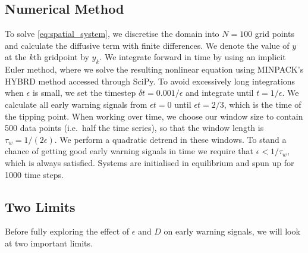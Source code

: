 \subsection{Numerical Method}
To solve \cref{eq:spatial_system}, we discretise the domain into $N = 100$ grid
points and 
calculate the diffusive term with finite differences. We denote the value of $y$ at the $k$th gridpoint by $y_k$. We integrate forward in time by 
using an implicit Euler method, where we solve the resulting nonlinear equation using 
MINPACK's HYBRD method accessed through SciPy\cite{Virtanen2020}. To avoid excessively long integrations when $\epsilon$ is small,
we set the timestep $\delta t = 0.001/\epsilon$ and integrate until $t=1/\epsilon$. We
calculate all early warning signals from $\epsilon t=0$ until $\epsilon t=2/3$, which is the 
time of the tipping point. When working over time, we choose our window size to 
contain 500 data points (i.e.\ half the time series),
so that the window length is $\tau_w = 1/(2\epsilon)$. We perform a quadratic detrend in these windows.
To stand a chance of getting good early warning
signals in time we require that $\epsilon < 1/\tau_w$, which is always satisfied.
Systems are initialised in equilibrium and spun up for 1000 time steps.
\subsection{Two Limits}
Before fully exploring the effect of $\epsilon$ and $D$ on early warning signals, we will look at two important limits.    
